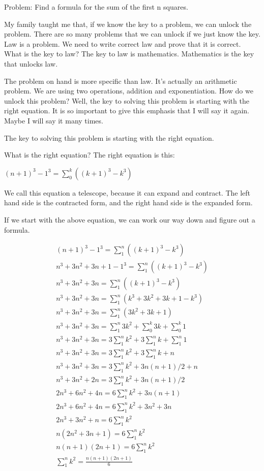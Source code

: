 Problem: Find a formula for the sum of the first n squares.

My family taught me that, if we know the key to a problem, we can unlock the problem. There are so many problems that we can unlock if we just know the key. Law is a problem. We need to write correct law and prove that it is correct. What is the key to law? The key to law is mathematics. Mathematics is the key that unlocks law.

The problem on hand is more specific than law. It's actually an arithmetic problem. We are using two operations, addition and exponentiation. How do we unlock this problem? Well, the key to solving this problem is starting with the right equation. It is so important to give this emphasis that I will say it again. Maybe I will say it many times.

The key to solving this problem is starting with the right equation.

What is the right equation? The right equation is this:

$(n+1)^3 - 1^3 = \sum_0^k ((k+1)^3 - k^3)$

We call this equation a telescope, because it can expand and contract. The left hand side is the contracted form, and the right hand side is the expanded form.

If we start with the above equation, we can work our way down and figure out a formula.

\begin{align*}
(n+1)^3 - 1^3 = \sum_1^n ((k+1)^3 - k^3) \\
n^3 + 3n^2 + 3n + 1 - 1^3 = \sum_1^n ((k+1)^3 - k^3) \\
n^3 + 3n^2 + 3n = \sum_1^n ((k+1)^3 - k^3) \\
n^3 + 3n^2 + 3n = \sum_1^n (k^3 + 3k^2 + 3k + 1 - k^3) \\
n^3 + 3n^2 + 3n = \sum_1^n (3k^2 + 3k + 1) \\
n^3 + 3n^2 + 3n = \sum_1^n 3k^2 + \sum_0^k 3k + \sum_0^k 1 \\
n^3 + 3n^2 + 3n = 3 \sum_1^n k^2 + 3 \sum_1^n k + \sum_1^n 1 \\
n^3 + 3n^2 + 3n = 3 \sum_1^n k^2 + 3 \sum_1^n k + n \\
n^3 + 3n^2 + 3n = 3 \sum_1^n k^2 + 3n(n+1)/2 + n \\
n^3 + 3n^2 + 2n = 3 \sum_1^n k^2 + 3n(n+1)/2 \\
2n^3 + 6n^2 + 4n = 6 \sum_1^n k^2 + 3n(n+1) \\
2n^3 + 6n^2 + 4n = 6 \sum_1^n k^2 + 3n^2 + 3n \\
2n^3 + 3n^2 + n = 6 \sum_1^n k^2 \\
n(2n^2 + 3n + 1) = 6 \sum_1^n k^2 \\
n(n + 1)(2n + 1) = 6 \sum_1^n k^2 \\
\sum_1^n k^2 = \frac{n(n + 1)(2n + 1)}{6} \\
\end{align*}

